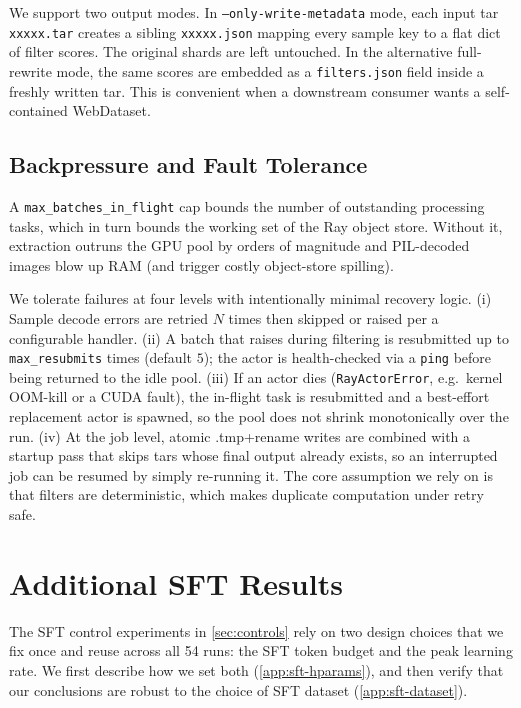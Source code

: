 We support two output modes.
In \texttt{--only-write-metadata} mode, each input tar \texttt{xxxxx.tar} creates a sibling \texttt{xxxxx.json} mapping every sample key to a flat dict of filter scores.
The original shards are left untouched.
In the alternative full-rewrite mode, the same scores are embedded as a \texttt{filters.json} field inside a freshly written tar.
This is convenient when a downstream consumer wants a self-contained WebDataset.


\subsection{Backpressure and Fault Tolerance}\label{app:annotation-fault-tolerance}

A \texttt{max\_batches\_in\_flight} cap bounds the number of outstanding processing tasks, which in turn bounds the working set of the Ray object store.
Without it, extraction outruns the GPU pool by orders of magnitude and PIL-decoded images blow up RAM (and trigger costly object-store spilling).

We tolerate failures at four levels with intentionally minimal recovery logic.
(i) Sample decode errors are retried $N$ times then skipped or raised per a configurable handler.
(ii) A batch that raises during filtering is resubmitted up to \texttt{max\_resubmits} times (default $5$); the actor is health-checked via a \texttt{ping} before being returned to the idle pool.
(iii) If an actor dies (\texttt{RayActorError}, e.g.\ kernel OOM-kill or a CUDA fault), the in-flight task is resubmitted and a best-effort replacement actor is spawned, so the pool does not shrink monotonically over the run.
(iv) At the job level, atomic .tmp+rename writes are combined with a startup pass that skips tars whose final output already exists, so an interrupted job can be resumed by simply re-running it.
The core assumption we rely on is that filters are deterministic, which makes duplicate computation under retry safe.
\clearpage

\section{Additional SFT Results}\label{app:sft}

The SFT control experiments in \cref{sec:controls} rely on two design choices that we fix once and reuse across all 54 runs: the SFT token budget and the peak learning rate. We first describe how we set both (\cref{app:sft-hparams}), and then verify that our conclusions are robust to the choice of SFT dataset (\cref{app:sft-dataset}).

